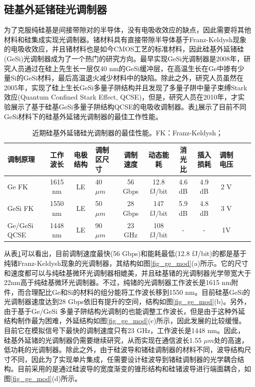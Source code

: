 \subsection{硅基外延锗硅光调制器}
为了克服纯硅基是间接带隙对的半导体，没有电吸收效应的缺点，因此需要将其他材料和硅集成实现光调制器。锗材料具有直接带隙半导体基于Franz-Keldysh现象的电吸收效应\cite{frova1965franz}，并且锗材料也是如今CMOS工艺的标准材料，因此硅基外延锗硅(GeSi)光调制器成为了一个热门的研究方向。最早实现GeSi光调制器是2008年\cite{liu2008waveguide}，研究人员通过在硅上先生长一层仅40 nm的GeSi缓冲层，在高温生长在Ge中掺有少量Si的GeSi材料，最后高温退火减少材料中的缺陷。除此之外，研究人员虽然在2005年，实现了硅上生长GeSi多量子阱结构并且发现了多量子阱中量子束缚Stark效应(Quantum Confined Stark Effect, QCSE)\cite{kuo2005strong}，但是，研究人员在2010年，才实验展示了基于硅基GeSi多量子阱结构QCSE的电吸收调制器\cite{rong2010quantum}。表\ref{sil_ge_mod}展示了目前不同GeSi材料下的硅基外延锗光调制器的最佳工作性能。
{
	\begin{table}[htb]
		\caption{近期硅基外延锗硅光调制器的最佳性能。FK：Franz-Keldysh；}
		\label{sil_ge_mod}
		\centering
		\begin{tabular}[t]{p{1.5cm}ccp{1.2cm}ccccccc}
			\hline
			调制原理 & 工作波长 & 电极结构 & 调制区尺寸 & 调制速度 & 动态能耗 & 消光比 & 插入损耗 & 调制电压\\
			\hline
			Ge FK\cite{Srinivasan201656} & 1615 nm & LE  & 40 $\mu m$ & 56 Gbps & 12.8 fJ/bit & 4.6 dB & 4.9 dB& 2 V\\
			GeSi FK\cite{Dazeng2013high} & 1550 nm & LE  & 50 $\mu m$ & 28 Gbps & 147 fJ/bit & 5.9 dB & 4.8 dB& 3 V\\
			Ge/GeSi QCSE\cite{chaisakul201223} & 1448 nm & LE & 90 $\mu m$ & 23 GHz & 108 fJ/bit & - & - & 1V\\
			\hline
		\end{tabular}
	\end{table}
}

从表\ref{sil_ge_mod}可以看出，目前调制速度最快(56 Gbps)和能耗最低(12.8 fJ/bit)的都是基于纯锗Franz-Keldysh现象的光调制器，其结构如图\ref{fig_ge_mod}(a)所示。它的尺寸和速度都可以与纯硅基微环光调制器相媲美，并且硅基锗的光调制器光学带宽大于22nm高于纯硅基微环光调制器\cite{Srinivasan201656}。不过，纯锗的光调制器工作波长是1615 nm附件，而合理配比Ge和Si的材料的组分能将工作波长移到1550 nm。目前硅基GeSi的光调制器速度达到28 Gbps依旧有提升的空间\cite{Dazeng2013high}，结构如图\ref{fig_ge_mod}(b)。另外，由于基于Ge/GeSi 多量子阱结构光调制的也能调整工作波长，但是由于这种外延结构制作最为困难，外延结构如图\ref{fig_ge_mod}(c)所示，因此发展的比较缓慢。目前它在模拟信号下最快的调制速度只有23 GHz，工作波长是1448 nm。因此，硅基外延锗的光调制器仍需要继续研究，从而实现在通信波长1.55 $\mu m$处的高速，低功耗的光调制器。除此之外，由于硅波导和锗硅调制器的材料不同，波导结构尺寸不同，因此为了实现单片集成，任需要设计硅波导到锗硅调制器的光学耦合结构。目前采用的是通过硅波导的宽度渐变的锥形结构和硅锗波导进行端面耦合，如图\ref{fig_ge_mod}(d)所示。

